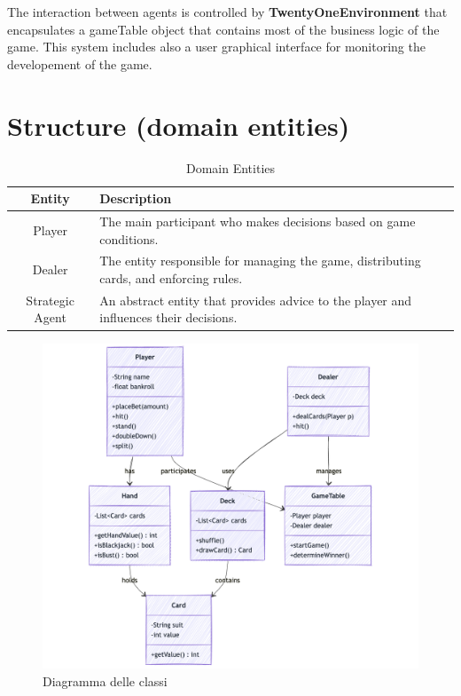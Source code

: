 The interaction between agents is controlled by \textbf{TwentyOneEnvironment} that encapsulates a gameTable object that contains most of the business logic of the game. This system includes also a user graphical interface for monitoring the developement of the game.

\section{Structure (domain entities)}

\begin{table}[h]
    \centering
    \renewcommand{\arraystretch}{1.3}
    \begin{tabular}{|c|p{8cm}|}
        \hline
        \textbf{Entity} & \textbf{Description} \\
        \hline
        Player & The main participant who makes decisions based on game conditions. \\
        \hline
        Dealer & The entity responsible for managing the game, distributing cards, and enforcing rules. \\
        \hline
        Strategic Agent & An abstract entity that provides advice to the player and influences their decisions. \\
        \hline
    \end{tabular}
    \caption{Domain Entities}
    \label{tab:domain_entities}
\end{table}

\begin{figure}[!htb]
    \centering
    \includegraphics[scale=0.55]{report/img/classDiagram.png}
    \caption{Diagramma delle classi}
    \label{fig:classDiagram}
\end{figure}

